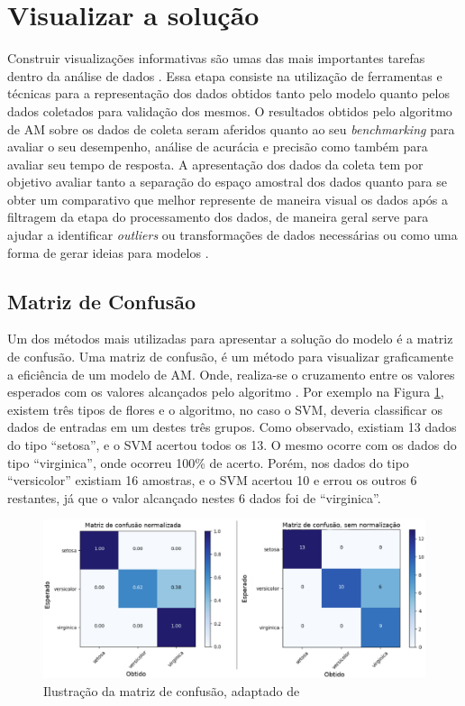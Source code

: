 \section{Visualizar a solução}
Construir visualizações informativas são umas das mais importantes tarefas dentro da análise de dados \cite{McKinney2012datapython}. Essa etapa consiste na utilização de ferramentas e técnicas para a representação dos dados obtidos tanto pelo modelo quanto pelos dados coletados para validação dos mesmos. O resultados obtidos pelo algoritmo de AM sobre os dados de coleta seram aferidos quanto ao seu \textit{benchmarking} \cite{Benchmarking} para avaliar o seu desempenho, análise de acurácia e precisão como também para avaliar seu tempo de resposta. A apresentação dos dados da coleta tem por objetivo avaliar tanto a separação do espaço amostral dos dados quanto para se obter um comparativo que melhor represente de maneira visual os dados após a filtragem da etapa do processamento dos dados, de maneira geral serve para ajudar a identificar \textit{outliers} ou transformações de dados necessárias ou como uma forma de gerar ideias para modelos \cite{McKinney2012datapython}.

\subsection{Matriz de Confusão}
\label{sc:matrizconsusao}
Um dos métodos mais utilizadas para apresentar a solução do modelo é a matriz de confusão. Uma matriz de confusão, é um método para visualizar graficamente a eficiência de um modelo de AM. Onde, realiza-se o cruzamento entre os valores esperados com os valores alcançados pelo algoritmo \cite{caelen2017bayesian}. Por exemplo na Figura \ref{matriz_consusao}, existem três tipos de flores e o algoritmo, no caso o SVM, deveria classificar os dados de entradas em um destes três grupos. Como observado, existiam 13 dados do tipo “setosa”, e o SVM acertou todos os 13. O mesmo ocorre com os dados do tipo “virginica”, onde ocorreu 100\% de acerto. Porém, nos dados do tipo “versicolor” existiam 16 amostras, e o SVM acertou 10 e errou os outros 6 restantes, já que o valor alcançado nestes 6 dados foi de “virginica”.

\begin{figure}[!htb]
	\centering
    \includegraphics[width=1.1\textwidth]{figuras/ma_normalizedy.eps}
    \caption{Ilustração da matriz de confusão, adaptado de \cite{scikitlearn}}
	\label{matriz_consusao}
\end{figure}

